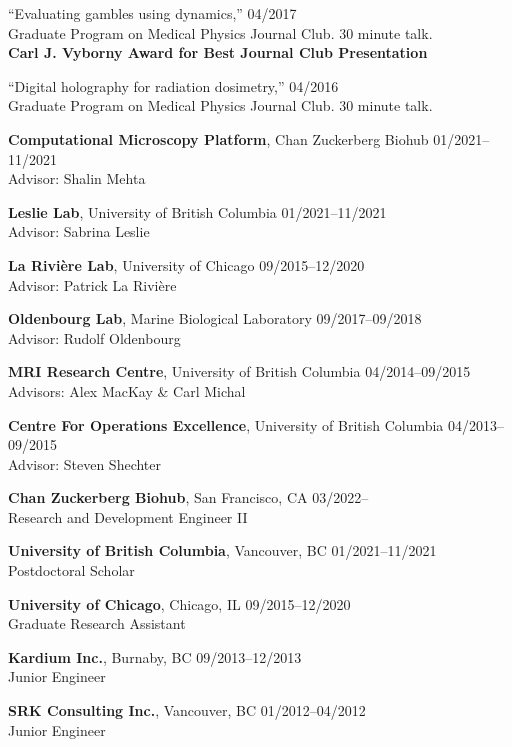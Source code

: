 \documentclass[12pt,letterpaper]{article}
\begin{document}
\begin{benumerate}{11}
\item {``Evaluating gambles using dynamics,'' \hfill 04/2017\\
    Graduate Program on Medical Physics Journal Club. 30 minute talk.\\
    \textbf{Carl J. Vyborny Award for Best Journal Club Presentation}}

\item {``Digital holography for radiation dosimetry,'' \hfill 04/2016\\
    Graduate Program on Medical Physics Journal Club. 30 minute talk.}
\end{benumerate}

\begin{benumerate}{6}
\item
  {\textbf{Computational Microscopy Platform}, Chan Zuckerberg Biohub} \hfill 01/2021--11/2021\\
  Advisor: Shalin Mehta
\item
  {\textbf{Leslie Lab}, University of British Columbia} \hfill 01/2021--11/2021\\
  Advisor: Sabrina Leslie
\item
  {\textbf{La Rivi\`ere Lab}, University of Chicago} \hfill 09/2015--12/2020\\
  Advisor: Patrick La Rivi\`ere
\item
  {\textbf{Oldenbourg Lab}, Marine Biological Laboratory} \hfill 09/2017--09/2018\\
  Advisor: Rudolf Oldenbourg
\item
  {\textbf{MRI Research Centre}, University of British Columbia} \hfill 04/2014--09/2015\\
  Advisors: Alex MacKay \& Carl Michal
\item
  {\textbf{Centre For Operations Excellence}, University of British Columbia} \hfill 04/2013--09/2015\\
  Advisor: Steven Shechter
\end{benumerate}

\begin{benumerate}{5}
\item
  \textbf{Chan Zuckerberg Biohub}, San Francisco, CA \hfill 03/2022--\\
  Research and Development Engineer II
\item
  \textbf{University of British Columbia}, Vancouver, BC \hfill 01/2021--11/2021\\
  Postdoctoral Scholar
\item
  \textbf{University of Chicago}, Chicago, IL \hfill 09/2015--12/2020\\
  Graduate Research Assistant
\item
  \textbf{Kardium Inc.}, Burnaby, BC \hfill 09/2013--12/2013\\
  Junior Engineer
\item
  \textbf{SRK Consulting Inc.}, Vancouver, BC \hfill 01/2012--04/2012\\
  Junior Engineer
\end{benumerate}
\end{document}
